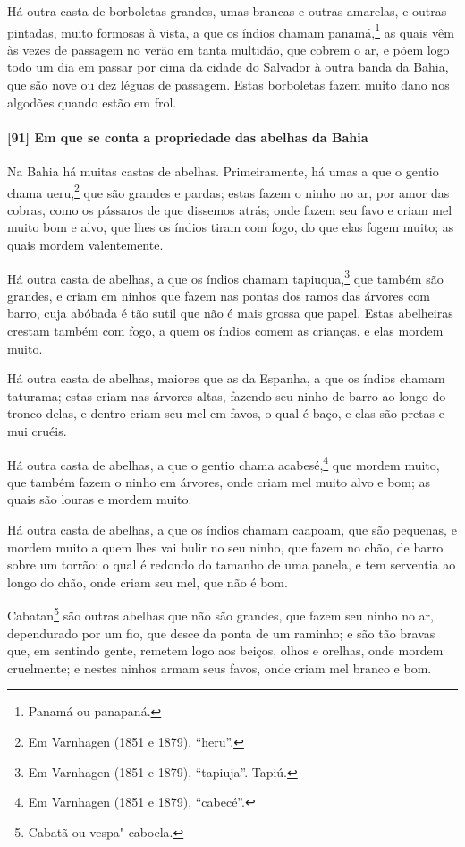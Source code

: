 Há outra casta de borboletas grandes, umas brancas e outras amarelas, e outras pintadas,
muito formosas à vista, a que os índios chamam panamá,\footnote{ Panamá ou panapaná.} as
quais vêm às vezes de passagem no verão em tanta multidão, que cobrem o ar, e põem logo
todo um dia em passar por cima da cidade do Salvador à outra banda da Bahia, que são nove
ou dez léguas de passagem. Estas borboletas fazem muito dano nos algodões quando estão em
frol.

\paragraph{[91] Em que se conta a propriedade das abelhas da Bahia}\quad
Na Bahia há muitas castas de abelhas. Primeiramente, há umas a que o gentio chama
ueru,\footnote{ Em Varnhagen (1851 e 1879), ``heru''.} que são grandes e pardas; estas
fazem o ninho no ar, por amor das cobras, como os pássaros de que dissemos atrás; onde
fazem seu favo e criam mel muito bom e alvo, que lhes os índios tiram com fogo, do que
elas fogem muito; as quais mordem valentemente.

Há outra casta de abelhas, a que os índios chamam tapiuqua,\footnote{ Em Varnhagen (1851 e
1879), ``tapiuja''. Tapiú.} que também são grandes, e criam em ninhos que fazem nas
pontas dos ramos das árvores com barro, cuja abóbada é tão sutil que não é mais grossa que
papel. Estas abelheiras crestam também com fogo, a quem os índios comem as crianças, e
elas mordem muito.

Há outra casta de abelhas, maiores que as da Espanha, a que os índios chamam taturama;
estas criam nas árvores altas, fazendo seu ninho de barro ao longo do tronco delas, e
dentro criam seu mel em favos, o qual é baço, e elas são pretas e mui cruéis.

Há outra casta de abelhas, a que o gentio chama acabesé,\footnote{ Em Varnhagen (1851 e
1879), ``cabecé''.} que mordem muito, que também fazem o ninho em árvores, onde criam mel
muito alvo e bom; as quais são louras e mordem muito.

Há outra casta de abelhas, a que os índios chamam caapoam, que são pequenas, e mordem
muito a quem lhes vai bulir no seu ninho, que fazem no chão, de barro sobre um torrão; o
qual é redondo do tamanho de uma panela, e tem serventia ao longo do chão, onde criam seu
mel, que não é bom.

Cabatan\footnote{ Cabatã ou vespa"-cabocla.} são outras abelhas que não são grandes, que
fazem seu ninho no ar, dependurado por um fio, que desce da ponta de um raminho; e são tão
bravas que, em sentindo gente, remetem logo aos beiços, olhos e orelhas, onde mordem
cruelmente; e nestes ninhos armam seus favos, onde criam mel branco e bom.

